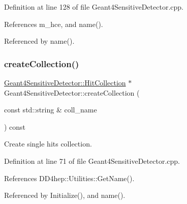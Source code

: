 Definition at line 128 of file Geant4\+Sensitive\+Detector.\+cpp.



References m\+\_\+hce, and name().



Referenced by name().

\hypertarget{class_d_d4hep_1_1_simulation_1_1_geant4_sensitive_detector_a9373b761f736437a3a7157c3afece920}{}\label{class_d_d4hep_1_1_simulation_1_1_geant4_sensitive_detector_a9373b761f736437a3a7157c3afece920} 
\subsubsection{\texorpdfstring{create\+Collection()}{createCollection()}}
{\footnotesize\ttfamily \hyperlink{class_d_d4hep_1_1_simulation_1_1_geant4_sensitive_detector_a4865cf9c96edfef8cd41e309a4cd6211}{Geant4\+Sensitive\+Detector\+::\+Hit\+Collection} $\ast$ Geant4\+Sensitive\+Detector\+::create\+Collection (\begin{DoxyParamCaption}\item[{const std\+::string \&}]{coll\+\_\+name }\end{DoxyParamCaption}) const\hspace{0.3cm}{\ttfamily [virtual]}}



Create single hits collection. 



Definition at line 71 of file Geant4\+Sensitive\+Detector.\+cpp.



References D\+D4hep\+::\+Utilities\+::\+Get\+Name().



Referenced by Initialize(), and name().

\hypertarget{class_d_d4hep_1_1_simulation_1_1_geant4_sensitive_detector_a4664d651826df03d0aba6f25a385b862}{}\label{class_d_d4hep_1_1_simulation_1_1_geant4_sensitive_detector_a4664d651826df03d0aba6f25a385b862} 
